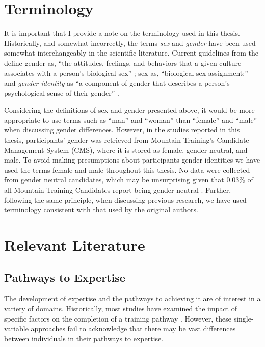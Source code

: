 \documentclass[
  12pt,
  a4paper,
]{book}
\begin{document}
\hypertarget{terminology}{%
\section{Terminology}\label{terminology}}

It is important that I provide a note on the terminology used in this thesis. Historically, and somewhat incorrectly, the terms \emph{sex} and \emph{gender} have been used somewhat interchangeably in the scientific literature. Current guidelines from the \citet{APA2020} define gender as, ``the attitudes, feelings, and behaviors that a given culture associates with a person's biological sex'' \citep[p 12]{APA2012}; sex as, ``biological sex assignment;'' and \textit{gender identity} as ``a component of gender that describes a person's psychological sense of their gender'' \citep[Section 5.5]{APA2020}.

Considering the definitions of sex and gender presented above, it would be more appropriate to use terms such as ``man'' and ``woman'' than ``female'' and ``male'' when discussing gender differences. However, in the studies reported in this thesis, participants' gender was retrieved from Mountain Training's Candidate Management System (CMS), where it is stored as female, gender neutral, and male. To avoid making presumptions about participants gender identities we have used the terms female and male throughout this thesis. No data were collected from gender neutral candidates, which may be unsurprising given that 0.03\% of all Mountain Training Candidates report being gender neutral \citep{MountainTrainingUK2019a}. Further, following the same principle, when discussing previous research, we have used terminology consistent with that used by the original authors.

\hypertarget{relevant-literature}{%
\section{Relevant Literature}\label{relevant-literature}}

\hypertarget{pathways-to-expertise}{%
\subsection{Pathways to Expertise}\label{pathways-to-expertise}}

The development of expertise and the pathways to achieving it are of interest in a variety of domains. Historically, most studies have examined the impact of specific factors on the completion of a training pathway \citep[e.g., delays in completing PhDs;][]{VandeSchoot2013a}. However, these single-variable approaches fail to acknowledge that there may be vast differences between individuals in their pathways to expertise.
\end{document}
